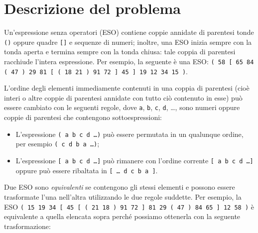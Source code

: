 \documentclass[a4paper,11pt]{article}
\begin{document}
\vspace{0.5cm}



\section*{Descrizione del problema}

Un'espressione senza operatori (ESO) contiene coppie annidate di
parentesi tonde \texttt{()} oppure quadre \texttt{[]} e sequenze di numeri; inoltre, una
ESO inizia sempre con la tonda aperta e termina sempre con la tonda
chiusa: tale coppia di parentesi racchiude l'intera espressione. Per esempio, la seguente è una ESO: 
\texttt{( 58 [ 65 84 ( 47 ) 29 81 [ ( 18 21 ) 91 72 ] 45 ] 19 12 34 15 )}.

L'ordine degli elementi immediamente contenuti in una coppia di
parentesi (cioè interi o altre coppie di parentesi annidate con tutto
ciò contenuto in esse) può essere cambiato con le seguenti regole, dove
\texttt{a}, \texttt{b}, \texttt{c}, \texttt{d}, \dots, sono numeri oppure
coppie di parentesi che contengono sottoespressioni:

\begin{itemize}
  \item L'espressione \texttt{( a b c d \dots )} può essere permutata in un qualunque ordine, per esempio \texttt{( c d b a \dots )};
  \item L'espressione \texttt{[ a b c d \dots ]} può rimanere con l'ordine corrente \texttt{[ a b c d \dots ]} oppure può essere ribaltata in \texttt{[ \dots\ d c b a ]}.
\end{itemize}


Due ESO sono \emph{equivalenti} se contengono gli stessi elementi e
possono essere trasformate l'una nell'altra utilizzando le due regole
suddette.  Per esempio, la ESO 
\texttt{( 15 19 34 [ 45 [ ( 21 18 ) 91 72 ] 81 29 ( 47 ) 84 65 ] 12 58 )}
è equivalente a quella elencata sopra perché possiamo ottenerla con
la seguente trasformazione:
\end{document}
